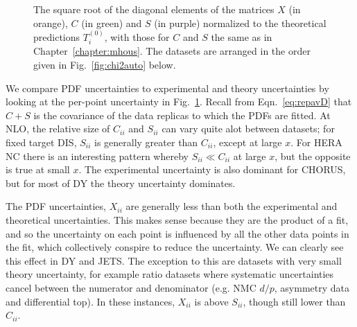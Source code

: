  \begin{figure}[H]
    \begin{center}
    \end{center}
  \vspace{-0.55cm}
  \caption{The square root of the diagonal elements of the matrices $X$ (in orange), $C$ (in green) and $S$ (in purple) normalized to the theoretical predictions $T^{(0)}_i$, with those for $C$ and $S$ the same as in Chapter~\ref{chapter:mhous}. The datasets are arranged in the order given in Fig.~\ref{fig:chi2auto} below.}
  \label{fig:CXS}
\end{figure}
We compare PDF uncertainties to experimental and theory uncertainties by looking at the per-point uncertainty in Fig.~\ref{fig:CXS}. Recall from Eqn.~\ref{eq:repavD} that $C+S$ is the covariance of the data replicas to which the PDFs are fitted. At NLO, the relative size of $C_{ii}$ and $S_{ii}$ can vary quite  alot between datasets; for fixed target DIS, $S_{ii}$ is generally greater than $C_{ii}$, except at large $x$. For HERA NC there is an interesting pattern whereby $S_{ii} \ll C_{ii}$ at large $x$, but the opposite is true at small $x$. The experimental uncertainty is also dominant for CHORUS, but for most of DY the theory uncertainty dominates. 

The PDF uncertainties, $X_{ii}$ are generally less than both the experimental and theoretical uncertainties. This makes sense because they are the product of a fit, and so the uncertainty on each point is influenced by all the other data points in the fit, which collectively conspire to reduce the uncertainty. We can clearly see this effect in DY and JETS. The exception to this are datasets with very small theory uncertainty, for example ratio datasets where systematic uncertainties cancel between the numerator and denominator (e.g. NMC $d/p$, asymmetry data and differential top). In these instances, $X_{ii}$ is above $S_{ii}$, though still lower than $C_{ii}$.

